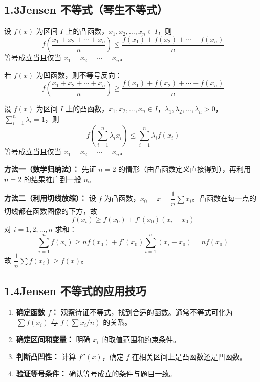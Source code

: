 \documentclass[12pt, a4paper]{ctexart}
\begin{document}
\subsection*{1.3\quad Jensen 不等式（琴生不等式）}

\begin{knowledgebox}
设 $f(x)$ 为区间 $I$ 上的凸函数，$x_1, x_2, \ldots, x_n \in I$，则
$$\boxed{f\!\left(\frac{x_1 + x_2 + \cdots + x_n}{n}\right) \leq \frac{f(x_1) + f(x_2) + \cdots + f(x_n)}{n}}$$
等号成立当且仅当 $x_1 = x_2 = \cdots = x_n$。

若 $f(x)$ 为凹函数，则不等号反向：
$$f\!\left(\frac{x_1 + x_2 + \cdots + x_n}{n}\right) \geq \frac{f(x_1) + f(x_2) + \cdots + f(x_n)}{n}$$
\end{knowledgebox}

\begin{knowledgebox}
设 $f(x)$ 为区间 $I$ 上的凸函数，$x_1, x_2, \ldots, x_n \in I$，$\lambda_1, \lambda_2, \ldots, \lambda_n > 0$，$\displaystyle\sum_{i=1}^n \lambda_i = 1$，则
$$\boxed{f\!\left(\sum_{i=1}^n \lambda_i x_i\right) \leq \sum_{i=1}^n \lambda_i f(x_i)}$$
等号成立当且仅当 $x_1 = x_2 = \cdots = x_n$。
\end{knowledgebox}

\begin{tipbox}
\textbf{方法一（数学归纳法）：} 先证 $n = 2$ 的情形（由凸函数定义直接得到），再利用 $n = 2$ 的结果推广到一般 $n$。

\textbf{方法二（利用切线放缩）：} 设 $f$ 为凸函数，$x_0 = \bar{x} = \dfrac{1}{n}\sum x_i$。凸函数在每一点的切线都在函数图像的下方，故
$$f(x_i) \geq f(x_0) + f'(x_0)(x_i - x_0)$$
对 $i = 1, 2, \ldots, n$ 求和：
$$\sum_{i=1}^n f(x_i) \geq nf(x_0) + f'(x_0)\sum_{i=1}^n (x_i - x_0) = nf(x_0)$$
故 $\dfrac{1}{n}\sum f(x_i) \geq f(\bar{x})$。
\end{tipbox}

\subsection*{1.4\quad Jensen 不等式的应用技巧}

\begin{knowledgebox}
\begin{enumerate}[label=\textbf{Step \arabic*.}]
  \item \textbf{确定函数 $f$：} 观察待证不等式，找到合适的函数。通常不等式可化为 $\sum f(x_i)$ 与 $f(\sum x_i / n)$ 的关系。
  \item \textbf{确定区间和变量：} 明确 $x_i$ 的取值范围和约束条件。
  \item \textbf{判断凸凹性：} 计算 $f''(x)$，确定 $f$ 在相关区间上是凸函数还是凹函数。
  \item \textbf{验证等号条件：} 确认等号成立的条件与题目一致。
\end{enumerate}
\end{knowledgebox}
\end{document}
